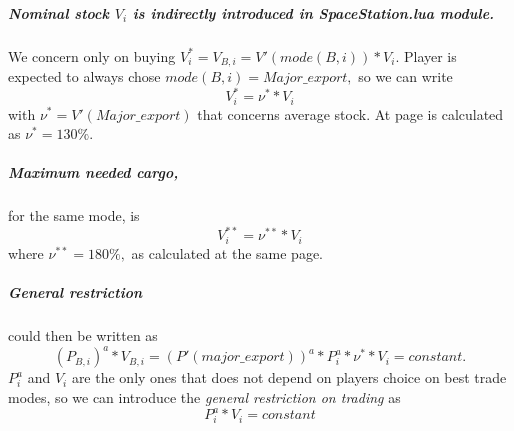 \documentclass[]{article}
\begin{document}
\subparagraph{Nominal stock $V_{i}$ is indirectly introduced in SpaceStation.lua module.}\label{nominalStock} We concern only on buying $V^{*}_{i} = V_{B,i}= V'(mode(B,i))*V_{i}.$ Player is expected to always chose $mode(B,i)=Major\_export,$ so we can write 
\begin{equation}\label{eq:nominalStock}
	V^{*}_{i}=\nu^{*}*V_{i}
\end{equation} 
with $\nu^{*}=V'(Major\_export)$ that concerns average stock. At page \pageref{averageMajorCargo} is calculated as $\nu^{*}=130\%.$  
\subparagraph*{Maximum needed cargo,} for the same mode, is
\begin{equation}\label{eq:maximumNeededCargo}
	V^{**}_i=\nu^{**}*V_{i}
\end{equation}
where $\nu^{**}=180\%,$ as calculated at the same page.
\subparagraph{General restriction} could then be written as
\[{(P_{B,i})}^a*V_{B,i}=(P'(major\_export))^{a}*P^{a}_{i}*\nu^{*}*V_{i}=constant.\]
$P^{a}_{i}$ and $V_{i}$ are the only ones that does not depend on players choice on best trade modes, so we can introduce the \emph{general restriction on trading} as
\begin{equation}\label{eq:general_invest_restriction}
	P^{a}_{i}*V_{i}=constant
\end{equation}
 
\end{document}
